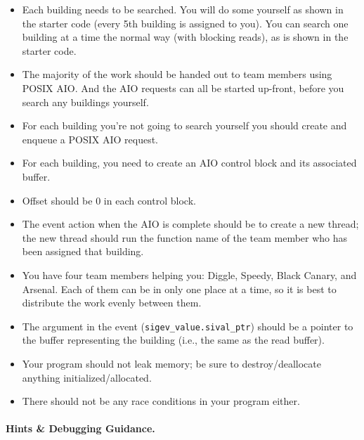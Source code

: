 \begin{itemize}
	\item Each building needs to be searched. You will do some yourself as shown in the starter code (every 5th building is assigned to you). You can search one building at a time the normal way (with blocking reads), as is shown in the starter code.
	\item The majority of the work should be handed out to team members using POSIX AIO. And the AIO requests can all be started up-front, before you search any buildings yourself.
	\item For each building you're not going to search yourself you should create and enqueue a POSIX AIO request.
	\item For each building, you need to create an AIO control block and its associated buffer.
	\item Offset should be 0 in each control block.
	\item The event action when the AIO is complete should be to create a new thread; the new thread should run the function name of the team member who has been assigned that building.
	\item You have four team members helping you: Diggle, Speedy, Black Canary, and Arsenal. Each of them can be in only one place at a time, so it is best to distribute the work evenly between them.
	\item The argument in the event (\texttt{sigev\_value.sival\_ptr}) should be a pointer to the buffer representing the building (i.e., the same as the read buffer).
	\item Your program should not leak memory; be sure to destroy/deallocate anything initialized/allocated.

	\item There should not be any race conditions in your program either.
\end{itemize}


\paragraph{Hints \& Debugging Guidance.}

